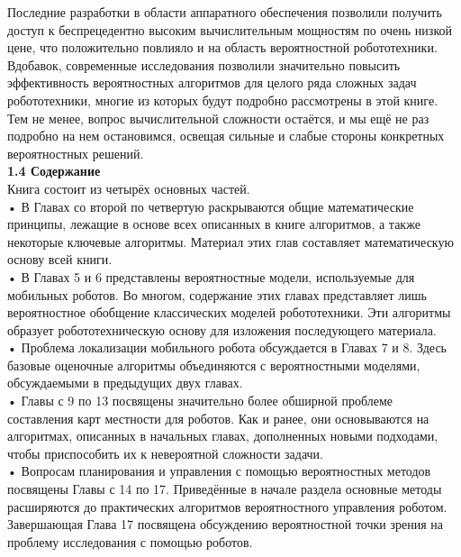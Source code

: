 \documentclass[10pt,a4paper]{article}
\begin{document}
Последние разработки в области аппаратного обеспечения позволили получить доступ к беспрецедентно высоким вычислительным мощностям по очень низкой цене, что положительно повлияло и на область вероятностной робототехники. Вдобавок, современные исследования позволили значительно повысить эффективность вероятностных алгоритмов для целого ряда сложных задач робототехники, многие из которых будут подробно рассмотрены в этой книге. Тем не менее,  вопрос вычислительной сложности остаётся, и мы ещё не раз подробно на нем остановимся, освещая сильные и слабые стороны конкретных вероятностных решений.\\

\textbf{1.4	Содержание}\\

Книга состоит из четырёх основных частей.\\

•	В Главах со второй по четвертую раскрываются общие математические принципы, лежащие в основе всех описанных в книге алгоритмов, а также некоторые ключевые алгоритмы. Материал этих глав составляет математическую основу всей книги.\\
 
•	В Главах 5 и 6 представлены вероятностные модели, используемые для мобильных роботов. Во многом, содержание этих главах представляет лишь вероятностное обобщение классических моделей робототехники. Эти алгоритмы образует робототехническую основу для изложения последующего материала.\\
 
•	Проблема локализации мобильного робота обсуждается в Главах 7 и 8. Здесь базовые оценочные алгоритмы объединяются с вероятностными моделями, обсуждаемыми в предыдущих двух главах.\\
 
•	Главы с 9 по 13 посвящены значительно более обширной проблеме составления карт местности для роботов. Как и ранее, они основываются на алгоритмах, описанных в начальных главах, дополненных новыми подходами, чтобы приспособить их к невероятной сложности задачи.\\
 
•	Вопросам планирования и управления с помощью вероятностных методов посвящены Главы с 14 по 17. Приведённые в начале раздела основные методы расширяются до практических алгоритмов вероятностного управления роботом. Завершающая Глава 17 посвящена обсуждению вероятностной точки зрения на проблему исследования с помощью роботов.\\
\end{document}
